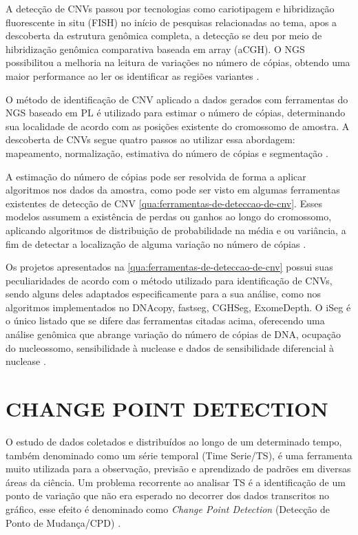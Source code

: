 A detecção de CNVs passou por tecnologias como cariotipagem e hibridização fluorescente in situ (FISH) no início de pesquisas relacionadas ao tema, apos a descoberta da estrutura genômica completa, a detecção se deu por meio de hibridização genômica comparativa baseada em array (aCGH). O NGS possibilitou a melhoria na leitura de variações no número de cópias, obtendo uma maior performance ao ler os identificar as regiões variantes \cite{Zhao2013}. 

O método de identificação de CNV aplicado a dados gerados com ferramentas do NGS baseado em PL é utilizado para estimar o número de cópias, determinando sua localidade de acordo com as posições existente do cromossomo de amostra. A descoberta de CNVs segue quatro passos ao utilizar essa abordagem: mapeamento, normalização, estimativa do número de cópias e segmentação \cite{Zhao2013}.

A estimação do número de cópias pode ser resolvida de forma a aplicar algoritmos nos dados da amostra, como pode ser visto em algumas ferramentas existentes de detecção de CNV \autoref{qua:ferramentas-de-deteccao-de-cnv}. Esses modelos assumem a existência de perdas ou ganhos ao longo do cromossomo, aplicando algoritmos de distribuição de probabilidade na média e ou variância, a fim de detectar a localização de alguma variação no número de cópias \cite{Zhao2013}.




Os projetos apresentados na \autoref{qua:ferramentas-de-deteccao-de-cnv} possui suas peculiaridades de acordo com o método utilizado para identificação de CNVs, sendo alguns deles adaptados especificamente para a sua análise, como nos algoritmos implementados no DNAcopy, fastseg, CGHSeg, ExomeDepth. O iSeg é o único listado que se difere das ferramentas citadas acima, oferecendo uma análise genômica que abrange variação do número de cópias de DNA, ocupação do nucleossomo, sensibilidade à nuclease e dados de sensibilidade diferencial à nuclease \cite{Girimurugan2018}. 

\section{CHANGE POINT DETECTION} 

O estudo de dados coletados e distribuídos ao longo de um determinado tempo, também denominado como um série temporal (Time Serie/TS), é uma ferramenta muito utilizada para a observação, previsão e aprendizado de padrões em diversas áreas da ciência. Um problema recorrente ao analisar TS é a identificação de um ponto de variação que não era esperado no decorrer dos dados transcritos no gráfico, esse efeito é denominado como \textit{Change Point Detection} (Detecção de Ponto de Mudança/CPD) \cite{Aminikhanghahi2017}.

